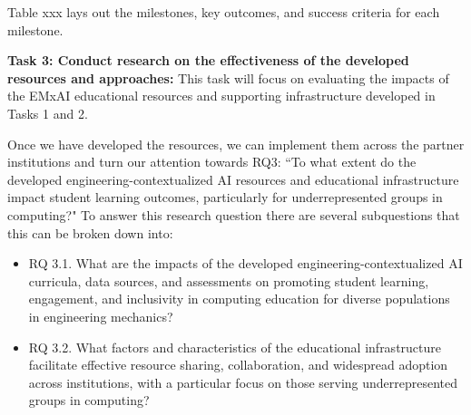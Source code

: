 \documentclass[11pt]{article}
\begin{document}
Table xxx lays out the milestones, key outcomes, and success criteria for each milestone. 


\begin{tcolorbox}[colback=mycmykcolor, colframe=black, boxrule=1pt, coltext=black]
\textbf{Task 3: Conduct research on the effectiveness of the developed resources and approaches:} This task will focus on  evaluating the impacts of the EMxAI educational resources and supporting infrastructure developed in Tasks 1 and 2.
\end{tcolorbox}

Once we have developed the resources, we can implement them across the partner institutions and turn our attention towards RQ3: ``To what extent do the developed engineering-contextualized AI resources and educational infrastructure impact student learning outcomes, particularly for underrepresented groups in computing?" 
To answer this research question there are several subquestions that this can be broken down into:
\begin{itemize}

\item[]RQ 3.1. What are the impacts of the developed engineering-contextualized AI curricula, data sources, and assessments on promoting student learning, engagement, and inclusivity in computing education for diverse populations in engineering mechanics?
\item[]RQ 3.2. What factors and characteristics of the educational infrastructure facilitate effective resource sharing, collaboration, and widespread adoption across institutions, with a particular focus on those serving underrepresented groups in computing?
\end{itemize}
\end{document}
